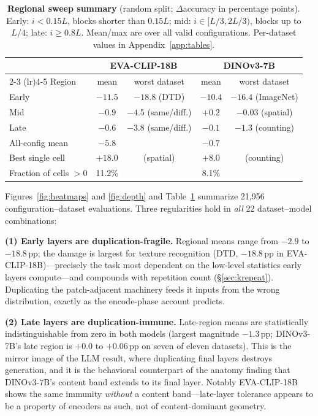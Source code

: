 \documentclass{article}
\newcommand{\eva}{EVA-CLIP-18B}
\newcommand{\dino}{DINOv3-7B}
\newcommand{\pp}{\,\mathrm{pp}}
\begin{document}
\begin{table}[t]
\caption{\textbf{Regional sweep summary} (random split;
$\Delta$accuracy in percentage points). Early: $i < 0.15L$, blocks
shorter than $0.15L$; mid: $i \in [L/3, 2L/3)$, blocks up to $L/4$;
late: $i \ge 0.8L$. Mean/max are over all valid configurations. Per-dataset
values in Appendix~\ref{app:tables}.}
\label{tab:regional}
\centering
\small
\begin{tabular}{lcccc}
\toprule
& \multicolumn{2}{c}{\eva{}} & \multicolumn{2}{c}{\dino{}} \\
\cmidrule(lr){2-3} \cmidrule(lr){4-5}
Region & mean & worst dataset & mean & worst dataset \\
\midrule
Early & $-11.5$ & $-18.8$ (DTD) & $-10.4$ & $-16.4$ (ImageNet) \\
Mid & $-0.9$ & $-4.5$ (same/diff.) & $+0.2$ & $-0.03$ (spatial) \\
Late & $-0.6$ & $-3.8$ (same/diff.) & $-0.1$ & $-1.3$ (counting) \\
\midrule
All-config mean & $-5.8$ & & $-0.7$ & \\
Best single cell & $+18.0$ & (spatial) & $+8.0$ & (counting) \\
Fraction of cells $>0$ & 11.2\% & & 8.1\% & \\
\bottomrule
\end{tabular}
\end{table}

Figures~\ref{fig:heatmaps} and \ref{fig:depth} and
Table~\ref{tab:regional} summarize 21{,}956 configuration--dataset
evaluations. Three regularities hold in \emph{all} 22 dataset--model
combinations:

\textbf{(1) Early layers are duplication-fragile.} Regional means range
from $-2.9$ to $-18.8\pp$; the damage is largest for texture recognition
(DTD, $-18.8\pp$ in \eva{})---precisely the task most dependent on the
low-level statistics early layers compute---and compounds with repetition
count (\S\ref{sec:krepeat}). Duplicating the patch-adjacent machinery
feeds it inputs from the wrong distribution, exactly as the encode-phase
account predicts.

\textbf{(2) Late layers are duplication-immune.} Late-region means are
statistically indistinguishable from zero in both models (largest
magnitude $-1.3\pp$; \dino{}'s late region is $+0.0$ to $+0.06\pp$ on
seven of eleven datasets). This is the mirror image of the LLM result,
where duplicating final layers destroys generation, and it is the
behavioral counterpart of the anatomy finding that \dino{}'s content band
extends to its final layer. Notably \eva{} shows the same immunity
\emph{without} a content band---late-layer tolerance appears to be a
property of encoders as such, not of content-dominant geometry.
\end{document}

